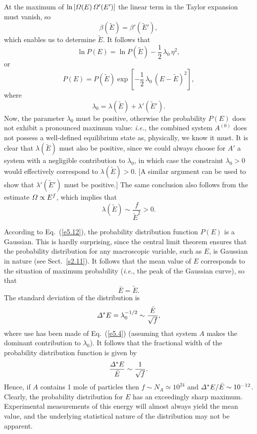 At the maximum of $\ln\,[{\mit\Omega}(E) \,{\mit\Omega}'(E')]$ the linear term in
the Taylor expansion must vanish, so
\begin{equation}
\beta (\tilde{E}) = \beta'(\tilde{E}'),
\end{equation}
which enables us to determine $\tilde{E}$. It follows that
\begin{equation}
\ln P(E) = \ln P(\tilde{E}) - \frac{1}{2}\,\lambda_0 \,\eta^2,
\end{equation}
or
\begin{equation}
P(E)=P(\tilde{E}) \exp\left[-\frac{1}{2}\,\lambda_0\, (E-\tilde{E})^2\right],\label{e5.12}
\end{equation}
where
\begin{equation}
\lambda_0 = \lambda (\tilde{E})+\lambda'(\tilde{E}').
\end{equation}
Now, the parameter $\lambda_0$ must be positive, otherwise the probability $P(E)$
does not exhibit a pronounced maximum value: {\em i.e.}, the combined system $A^{(0)}$
does not possess a well-defined equilibrium state as, physically, we know it must.
It is clear that  $\lambda(\tilde{E})$  must also be
positive, since we could always choose for $A'$ a system with a negligible contribution
to $\lambda_0$, in which case the constraint $\lambda_0>0$ would 
effectively correspond to $\lambda(\tilde{E})>0$. [A similar argument can be used to
show that $\lambda'(\tilde{E}')$ must be
positive.] The same conclusion also follows from
the estimate ${\mit\Omega}\propto E^f$, which implies that
\begin{equation}
\lambda(\tilde{E}) \sim \frac{f}{\tilde{E}^2}>0.
\end{equation}

According to Eq.~(\ref{e5.12}), the probability distribution function $P(E)$ is
a Gaussian. This is hardly surprising, since the central limit theorem ensures that 
the probability distribution for any macroscopic variable, such as $E$, is Gaussian 
in
nature (see Sect.~\ref{s2.11}). It follows that the mean value of $E$ corresponds to
the situation of maximum probability ({\em i.e.}, the peak of the Gaussian curve), so
that 
\begin{equation}
\bar{E} = \tilde{E}.
\end{equation}
The standard deviation of the distribution  is
\begin{equation}
{\mit\Delta}^\ast E = \lambda_0^{-1/2}\sim \frac{\bar{E}}{\sqrt{f}},
\end{equation}
where use has been made of Eq.~(\ref{e5.4}) (assuming that system $A$ makes the dominant
contribution to $\lambda_0$). It follows that the fractional width of the
probability distribution function is given by
\begin{equation}
\frac{{\mit\Delta}^\ast E}{\bar{E}}\sim \frac{1}{\sqrt{f}}.
\end{equation}
Hence, if $A$ contains 1 mole of particles then $f\sim N_A\simeq 10^{24}$ and
${\mit\Delta}^\ast E /\bar{E}\sim 10^{-12}$. Clearly, the probability
distribution for $E$ has an exceedingly sharp maximum. Experimental
measurements of this energy will almost always yield the mean value,
 and the underlying
statistical nature of the distribution may not be apparent.

